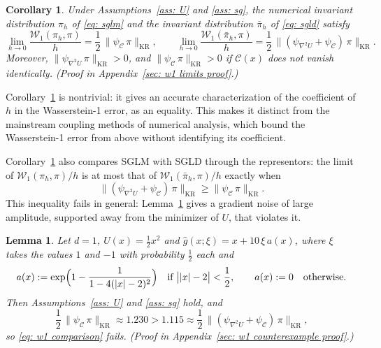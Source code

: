\documentclass{article}
\newtheorem{lemma}{Lemma}
\newtheorem{corollary}{Corollary}
\newcommand{\Ge}{\geqslant}
\newcommand{\norm}[1]{\lVert #1 \rVert}
\numberwithin{equation}{section}
\begin{document}
\begin{corollary}
\label{cor: w1 limits}
    Under Assumptions~\ref{ass: U} and \ref{ass: sg}, the numerical invariant distribution $\pi_h$ of \eqref{eq: sglm} and the invariant distribution $\bar\pi_h$ of \eqref{eq: sgld} satisfy
    \begin{equation*}
        \lim_{h \to 0} \frac{\mathcal W_1(\pi_h, \pi)}{h} = \frac12\, \norm{\psi_{\mathcal C}\, \pi}_{\mathrm{KR}} , \qquad
        \lim_{h \to 0} \frac{\mathcal W_1(\bar\pi_h, \pi)}{h} = \frac12\, \norm{( \psi_{\nabla^2 U} + \psi_{\mathcal C} )\, \pi}_{\mathrm{KR}} .
    \end{equation*}
    Moreover, $\norm{\psi_{\nabla^2 U}\, \pi}_{\mathrm{KR}} > 0$, and $\norm{\psi_{\mathcal C}\, \pi}_{\mathrm{KR}} > 0$ if $\mathcal C(x)$ does not vanish identically. \emph{(Proof in Appendix~\ref{sec: w1 limits proof}.)}
\end{corollary}

Corollary~\ref{cor: w1 limits} is nontrivial: it gives an accurate characterization of the coefficient of $h$ in the Wasserstein-1 error, as an equality. This makes it distinct from the mainstream coupling methods of numerical analysis, which bound the Wasserstein-1 error from above without identifying its coefficient.

Corollary~\ref{cor: w1 limits} also compares SGLM with SGLD through the representors: the limit of $\mathcal W_1(\pi_h, \pi)/h$ is at most that of $\mathcal W_1(\bar\pi_h, \pi)/h$ exactly when
\begin{equation}
    \norm{( \psi_{\nabla^2 U} + \psi_{\mathcal C} )\, \pi}_{\mathrm{KR}} \Ge \norm{\psi_{\mathcal C}\, \pi}_{\mathrm{KR}} .
    \label{eq: w1 comparison}
\end{equation}
This inequality fails in general: Lemma~\ref{lem: w1 counterexample} gives a gradient noise of large amplitude, supported away from the minimizer of $U$, that violates it.

\begin{lemma}
\label{lem: w1 counterexample}
    Let $d = 1$, $U(x) = \frac12 x^2$ and $\hat g(x;\xi) = x + 10\, \xi\, a(x)$, where $\xi$ takes the values $1$ and $-1$ with probability $\frac12$ each and
    \begin{equation}
        a(x) := \exp\Bigl( 1 - \frac{1}{1 - 4 (|x| - 2)^2} \Bigr) \quad \text{if } \bigl| |x| - 2 \bigr| < \frac12 , \qquad a(x) := 0 \quad \text{otherwise} .
        \label{eq: shell noise}
    \end{equation}
    Then Assumptions~\ref{ass: U} and \ref{ass: sg} hold, and
    \begin{equation*}
        \frac12\, \norm{\psi_{\mathcal C}\, \pi}_{\mathrm{KR}} \approx 1.230 > 1.115 \approx \frac12\, \norm{( \psi_{\nabla^2 U} + \psi_{\mathcal C} )\, \pi}_{\mathrm{KR}} ,
    \end{equation*}
    so \eqref{eq: w1 comparison} fails. \emph{(Proof in Appendix~\ref{sec: w1 counterexample proof}.)}
\end{lemma}
\end{document}
